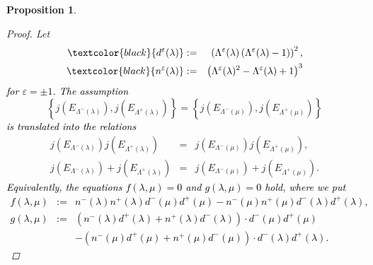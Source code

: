 \documentclass[a4paper, 11pt]{article}
\theoremstyle{plain}
\newtheorem{prop}[defn]{Proposition}
\newcommand{\?}{\textcolor{red}{??}}
\newcommand{\lm}{\lambda}
\newcommand{\Lm}{\Lambda}
\begin{document}
\begin{prop}
    \begin{proof}
       Let
       \begin{eqnarray*}
       \textcolor{black}{d^{\varepsilon}(\lm)}
       &:=& \left(\Lm^{\varepsilon}(\lm)\left(\Lm^{\varepsilon}(\lm)-1\right)\right)^2,\\
       \textcolor{black}{n^{\varepsilon}(\lm)}
       &:=& \left(\Lm^{\varepsilon}(\lm)^2-\Lm^{\varepsilon}(\lm)+1 \right)^3
       \end{eqnarray*}
       \textcolor{black}{for $\varepsilon=\pm1$. The assumption}
       \[ \left\{j\left(E_{\Lambda^{-}(\lm)}\right),j\left(E_{\Lambda^{+}(\lm)}\right) \right\}=\left\{j\left(E_{\Lambda^{-}(\mu)} \right),j\left(E_{\Lambda^{+}(\mu)} \right)\right \}
       \]
       \textcolor{black}{is translated into the relations}
       \begin{eqnarray*}
           j\left(E_{\Lambda^{-}(\lm)}\right) j\left(E_{\Lambda^{+}(\lm)}\right) &=&j\left(E_{\Lambda^{-}(\mu)}\right)j\left(E_{\Lambda^{+}(\mu)}\right), \\j\left(E_{\Lambda^{-}(\lm)}\right)+j\left(E_{\Lambda^{+}(\lm)}\right) &=&j\left(E_{\Lambda^{-}(\mu)}\right)+ j\left(E_{\Lambda^{+}(\mu)}\right).
       \end{eqnarray*}
\textcolor{black}{Equivalently, the equations 
$f(\lm,\mu)=0$ and $g(\lm,\mu)=0$
hold, where we put
 \begin{eqnarray*}
 f(\lm,\mu)&:=&n^{-}(\lm)n^{+}(\lm)d^{-}(\mu)d^{+}(\mu) -n^{-}(\mu)n^{+}(\mu)d^{-}(\lm)d^{+}(\lm),\\
g(\lm,\mu)&:=&\left(n^{-}(\lm)d^{+}(\lm)+n^{+}(\lm)d^{-}(\lm)\right)\cdot d^{-}(\mu) d^{+}(\mu)\\
       &&-\left(n^{-}(\mu)d^{+}(\mu)+n^{+}(\mu)d^{-}(\mu) \right)\cdot d^{-}(\lm) d^{+}(\lm).
 \end{eqnarray*}
}
\end{proof}
\end{prop}
\end{document}
